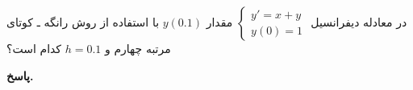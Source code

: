 در معادله دیفرانسیل 
\(\begin{cases}
	y' = x + y\\
	y(0) = 1
\end{cases}\)
مقدار
\(y(0.1)\)
با استفاده از روش رانگه ‌ـ کوتای مرتبه چهارم
و
\(h=0.1\)
کدام است؟
\vspace*{-.3cm}

\begin{answer}

	\textbf{پاسخ.}
	
\end{answer}
